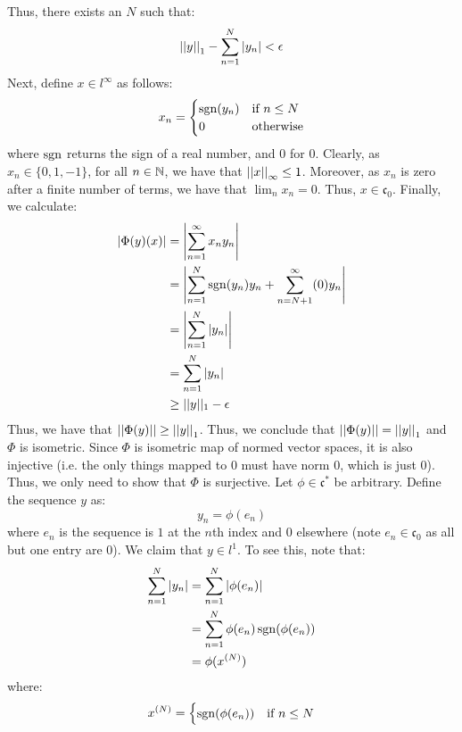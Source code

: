 \documentclass[12pt]{article}
\begin{document}
\begin{solution}
\begin{enumerate}
        Thus, there exists an $N$ such that: 
        \[\left\vert\left\vert y\right\vert\right\vert_1 - \sum_{n=1}^N |y_n| < \epsilon\]
        Next, define $x \in l^\infty$ as follows: 
        \begin{align*}
            x_n = \begin{cases}
                \operatorname{sgn}(y_n) & \text{if } n \leq N \\
                0 & \text{otherwise} 
            \end{cases}
        \end{align*}
        where $\operatorname{sgn}$ returns the sign of a real number, and $0$ for $0$. \bbni
        Clearly, as $x_n \in \{0, 1, -1\}$, for all $n \in \mathbb N$, we have that $\left\vert\left\vert x\right\vert\right\vert_\infty \leq 1$. Moreover, as $x_n$ is zero after a finite number of terms, we have that $\lim_n x_n = 0$. Thus, $x \in \mathfrak{c}_0$. Finally, we calculate: 
        \begin{align*}
            |\Phi(y)(x)| &= \left|\sum_{n=1}^\infty x_ny_n\right| \\
            &= \left|\sum_{n=1}^N \operatorname{sgn}(y_n)y_n + \sum_{n=N+1}^\infty (0)y_n\right| \\
            &= \left|\sum_{n=1}^N |y_n|\right| \\
            &= \sum_{n=1}^N |y_n| \\
            &\geq ||y||_1 - \epsilon
        \end{align*}
        Thus, we have that $\left\vert\left\vert\Phi(y)\right\vert\right\vert \geq \left\vert\left\vert y\right\vert\right\vert_1$. Thus, we conclude that $\left\vert\left\vert\Phi(y)\right\vert\right\vert = \left\vert\left\vert y\right\vert\right\vert_1$ and $\Phi$ is isometric. \bbni 
        Since $\Phi$ is isometric map of normed vector spaces, it is also injective (i.e. the only things mapped to $0$ must have norm $0$, which is just $0$). Thus, we only need to show that $\Phi$ is surjective. \bbni
        Let $\phi \in \mathfrak{c}^*$ be arbitrary. Define the sequence $y$ as:
        \[ y_n = \phi(e_n) \]
        where $e_n$ is the sequence is $1$ at the $n$th index and $0$ elsewhere (note $e_n \in \mathfrak{c}_0$ as all but one entry are $0$). We claim that $y \in l^1$. To see this, note that: 
        \begin{align*}
            \sum_{n=1}^N |y_n| &= \sum_{n=1}^N |\phi(e_n)| \\
            &= \sum_{n=1}^N \phi(e_n)\operatorname{sgn}(\phi(e_n)) \\
            &= \phi(x^{(N)})
        \end{align*}
        where: 
        \[ x^{(N)} = \begin{cases}
            \operatorname{sgn}(\phi(e_n)) & \text{if } n \leq N \\ 

\end{cases}\]
\end{enumerate}
\end{solution}
\end{document}
